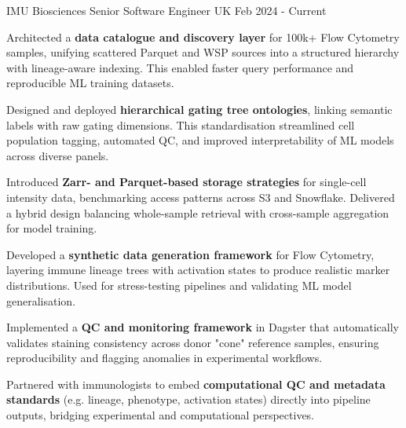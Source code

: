 

\begin{cventries}

  \cventry
    {IMU Biosciences}
    {Senior Software Engineer}
    {UK} %
    {Feb 2024 - Current} %
    {
    \begin{cvitems}
        \item {Architected a \textbf{data catalogue and discovery layer} for 100k+ Flow Cytometry samples, unifying scattered Parquet and WSP sources into a structured hierarchy with lineage-aware indexing. This enabled faster query performance and reproducible ML training datasets.}
        \item {Designed and deployed \textbf{hierarchical gating tree ontologies}, linking semantic labels with raw gating dimensions. This standardisation streamlined cell population tagging, automated QC, and improved interpretability of ML models across diverse panels.}
        \item {Introduced \textbf{Zarr- and Parquet-based storage strategies} for single-cell intensity data, benchmarking access patterns across S3 and Snowflake. Delivered a hybrid design balancing whole-sample retrieval with cross-sample aggregation for model training.}
        \item {Developed a \textbf{synthetic data generation framework} for Flow Cytometry, layering immune lineage trees with activation states to produce realistic marker distributions. Used for stress-testing pipelines and validating ML model generalisation.}
        \item {Implemented a \textbf{QC and monitoring framework} in Dagster that automatically validates staining consistency across donor "cone" reference samples, ensuring reproducibility and flagging anomalies in experimental workflows.}
        \item {Partnered with immunologists to embed \textbf{computational QC and metadata standards} (e.g. lineage, phenotype, activation states) directly into pipeline outputs, bridging experimental and computational perspectives.}
    \end{cvitems}
}
\end{cventries}
